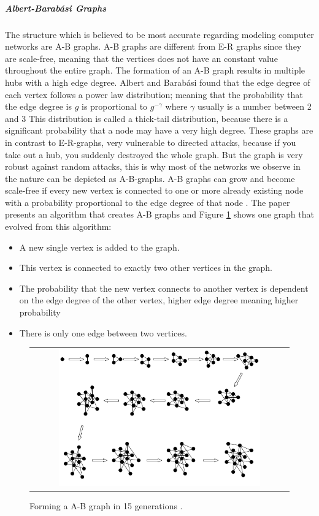 \subparagraph{\label{ABgraph}Albert-Barabási Graphs}
The structure which is believed to be most accurate regarding modeling computer networks are A-B graphs. A-B graphs are different from E-R graphs since they are scale-free, meaning that the vertices does not have an constant value throughout the entire graph. The formation of an A-B graph results in multiple hubs with a high edge degree. Albert and Barabási found that the edge degree of each vertex follows a power law distribution; meaning that the probability that the edge degree is $g$ is proportional to $g^{-\gamma}$
where $\gamma$ usually is a number between 2 and 3  This distribution is called a thick-tail distribution, because there is a significant probability that a node may have a very high degree. \cite{audestad}
These graphs are in contrast to E-R-graphs, very vulnerable to directed attacks, because if you take out a hub, you suddenly destroyed the whole graph. But the graph is very robust against random attacks, this is why most of the networks we observe in the nature can be depicted as A-B-graphs.
A-B graphs can grow and become scale-free if every new vertex is connected to one or more already existing node with a probability proportional to the edge degree of that node . The paper presents an algorithm that creates A-B graphs and Figure \ref{fig:ABgraphcreation} shows one graph that evolved from this algorithm:

\begin{itemize}
\item A new single vertex is added to the graph.
\item This vertex is connected to exactly two other vertices in the graph.
\item The probability that the new vertex connects to another vertex is dependent on the edge degree of the other vertex, higher edge degree meaning higher probability
\item There is only one edge between two vertices.
\end{itemize}


\begin{figure}[h]
\centering
\begin{tabular}{@{}c@{}}
\includegraphics[width=0.8\textwidth]{../Figures/ABgraphcreation.png}
\end{tabular}
\caption{\label{fig:ABgraphcreation} Forming a A-B graph in 15 generations \cite{audestad}.}
\end{figure}


